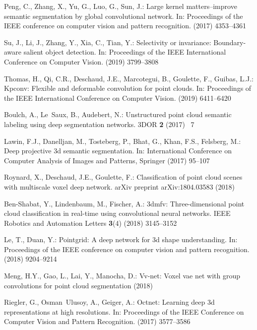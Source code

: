 \documentclass[runningheads]{llncs}
\begin{document}
\begin{thebibliography}{10}
Peng, C., Zhang, X., Yu, G., Luo, G., Sun, J.:
\newblock Large kernel matters--improve semantic segmentation by global
  convolutional network.
\newblock In: Proceedings of the IEEE conference on computer vision and pattern
  recognition. (2017)  4353--4361

Su, J., Li, J., Zhang, Y., Xia, C., Tian, Y.:
\newblock Selectivity or invariance: Boundary-aware salient object detection.
\newblock In: Proceedings of the IEEE International Conference on Computer
  Vision. (2019)  3799--3808

Thomas, H., Qi, C.R., Deschaud, J.E., Marcotegui, B., Goulette, F., Guibas,
  L.J.:
\newblock Kpconv: Flexible and deformable convolution for point clouds.
\newblock In: Proceedings of the IEEE International Conference on Computer
  Vision. (2019)  6411--6420

Boulch, A., Le~Saux, B., Audebert, N.:
\newblock Unstructured point cloud semantic labeling using deep segmentation
  networks.
\newblock 3DOR \textbf{2} (2017) ~7

Lawin, F.J., Danelljan, M., Tosteberg, P., Bhat, G., Khan, F.S., Felsberg, M.:
\newblock Deep projective 3d semantic segmentation.
\newblock In: International Conference on Computer Analysis of Images and
  Patterns, Springer (2017)  95--107

Roynard, X., Deschaud, J.E., Goulette, F.:
\newblock Classification of point cloud scenes with multiscale voxel deep
  network.
\newblock arXiv preprint arXiv:1804.03583 (2018)

Ben-Shabat, Y., Lindenbaum, M., Fischer, A.:
\newblock 3dmfv: Three-dimensional point cloud classification in real-time
  using convolutional neural networks.
\newblock IEEE Robotics and Automation Letters \textbf{3}(4) (2018)  3145--3152

Le, T., Duan, Y.:
\newblock Pointgrid: A deep network for 3d shape understanding.
\newblock In: Proceedings of the IEEE conference on computer vision and pattern
  recognition. (2018)  9204--9214

Meng, H.Y., Gao, L., Lai, Y., Manocha, D.:
\newblock Vv-net: Voxel vae net with group convolutions for point cloud
  segmentation (2018)

Riegler, G., Osman~Ulusoy, A., Geiger, A.:
\newblock Octnet: Learning deep 3d representations at high resolutions.
\newblock In: Proceedings of the IEEE Conference on Computer Vision and Pattern
  Recognition. (2017)  3577--3586


\end{thebibliography}
\end{document}
